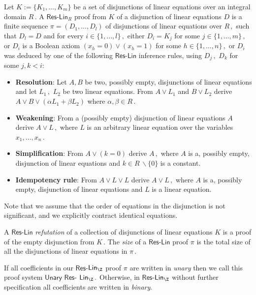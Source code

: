 \documentclass{toc}
\begin{document}
\begin{definition}
Let $K := \{K_1, \ldots, K_m\}$ be a set of disjunctions of linear equations over an integral domain %
$R\,.$ %
 A $\mathsf{Res}$-$\mathsf{Lin}_R$ proof from $K$ of a disjunction of linear equations $D$ is a finite sequence $\pi = (D_1, \ldots, D_l)$ of disjunctions of linear equations over %
$R\,,$ %
 such that $D_l = D$ and for every %
$i \in \{1, \ldots, l\}\,,$ %
 either $D_i = K_j$ for some %
$j \in \{1, \ldots, m\}\,,$ %
 or $D_i$ is a Boolean axiom $(x_h = 0) \vee (x_h = 1)$ for some %
$h \in \{1, \ldots, n\}\,,$ %
 or $D_i$ was deduced by one of the following $\mathsf{Res}$-$\mathsf{Lin}$ inference rules, using %
$D_j\,,$ %
 $D_k$ for some $j, k < i$:
\begin{itemize}
    \item \textbf{Resolution}: Let $A, B$ be two, possibly empty, disjunctions of linear equations and let %
$L_1\,,$ %
 $L_2$ be two linear equations. From $A \vee L_1$ and $B \vee L_2$ derive $A \vee B \vee (\alpha L_1 + \beta L_2)$ where %
$\alpha, \beta \in R\,.$ %
    \item \textbf{Weakening}: From a (possibly empty) disjunction of linear equations $A$ derive %
$A \vee L\,,$ %
 where $L$ is an arbitrary linear equation over the variables %
$x_1, \ldots, x_n\,.$ %
    \item \textbf{Simplification}: From $A \vee (k = 0)$ derive %
$A\,,$ %
 where $A$ is a, possibly empty, disjunction of linear equations and $k \in R \, \backslash \{0\}$ is a constant.
    \item \textbf{Idempotency rule}: From $A \vee L \vee L$ derive %
$A \vee L\,,$ %
 where $A$ is a, possibly empty, disjunction of linear equations and $L$ is a linear equation. %
\end{itemize}
%
Note that we assume that the order of equations in the disjunction is not significant, and we explicitly contract identical equations. %

A $\mathsf{Res}$-$\mathsf{Lin}$ \emph{refutation} of a collection of disjunctions of linear equations $K$ is a proof of the empty disjunction from %
$K\,.$ %
 The \emph{size} of %
 a $\mathsf{Res}$-$\mathsf{Lin}$ proof $\pi$ is the total size of all the disjunctions of linear equations in %
$\pi\,.$ %

%
If all coefficients in our $\mathsf{Res}$-$\mathsf{Lin}_{\Z}$ proof $\pi$ are written in \emph{unary} then we call this proof system $\mathsf{Unary}$ $\mathsf{Res}$-%
$\mathsf{Lin}_{\Z}\,.$ %
 Otherwise, in $\mathsf{Res}$-$\mathsf{Lin}_{\Z}$ without further specification all coefficients are written in \emph{binary}. %
\end{definition}
\end{document}
